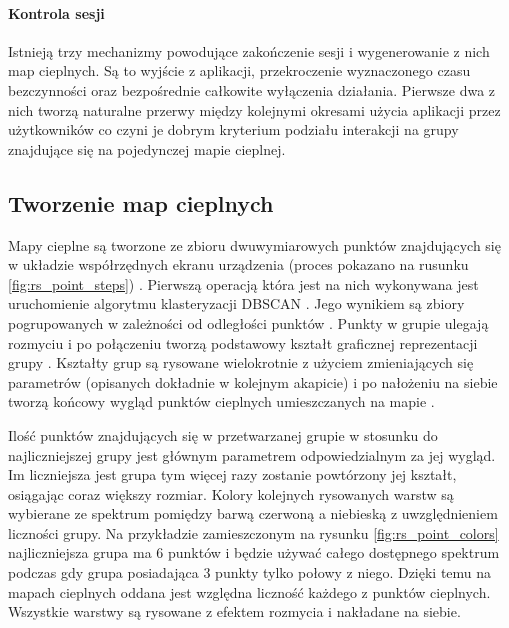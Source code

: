 
\paragraph{Kontrola sesji}
Istnieją trzy mechanizmy powodujące zakończenie sesji i wygenerowanie z nich map cieplnych. Są to wyjście z aplikacji, przekroczenie wyznaczonego czasu bezczynności oraz bezpośrednie całkowite wyłączenia działania. Pierwsze dwa z nich tworzą naturalne przerwy między kolejnymi okresami użycia aplikacji przez użytkowników co czyni je dobrym kryterium podziału interakcji na grupy znajdujące się na pojedynczej mapie cieplnej.

\newcommand*\circled[1]{\tikz[baseline=(char.base)]{\node[shape=circle,draw,inner sep=1.2pt] (char) {#1};}}

\subsection{Tworzenie map cieplnych}
Mapy cieplne są tworzone ze zbioru dwuwymiarowych punktów znajdujących się w układzie współrzędnych ekranu urządzenia (proces pokazano na rusunku \ref{fig:rs_point_steps}) \circled{1}. Pierwszą operacją która jest na nich wykonywana jest uruchomienie algorytmu klasteryzacji DBSCAN \cite{DBSCAN_Wiki}. Jego wynikiem są zbiory pogrupowanych w zależności od odległości punktów \circled{2}. Punkty w grupie ulegają rozmyciu \circled{3} i po połączeniu tworzą podstawowy kształt graficznej reprezentacji grupy \circled{4}. Kształty grup są rysowane wielokrotnie z użyciem zmieniających się parametrów (opisanych dokładnie w kolejnym akapicie) \circled{5} i po nałożeniu na siebie tworzą końcowy wygląd punktów cieplnych umieszczanych na mapie \circled{6}.


Ilość punktów znajdujących się w przetwarzanej grupie w stosunku do najliczniejszej grupy jest głównym parametrem odpowiedzialnym za jej wygląd. Im liczniejsza jest grupa tym więcej razy zostanie powtórzony jej kształt, osiągając coraz większy rozmiar. Kolory kolejnych rysowanych warstw są wybierane ze spektrum pomiędzy barwą czerwoną a niebieską z uwzględnieniem liczności grupy. Na przykładzie zamieszczonym na rysunku \ref{fig:rs_point_colors} najliczniejsza grupa ma $6$ punktów i będzie używać całego dostępnego spektrum podczas gdy grupa posiadająca $3$ punkty tylko połowy z niego. Dzięki temu na mapach cieplnych oddana jest względna liczność każdego z punktów cieplnych. Wszystkie warstwy są rysowane z efektem rozmycia i nakładane na siebie. 

